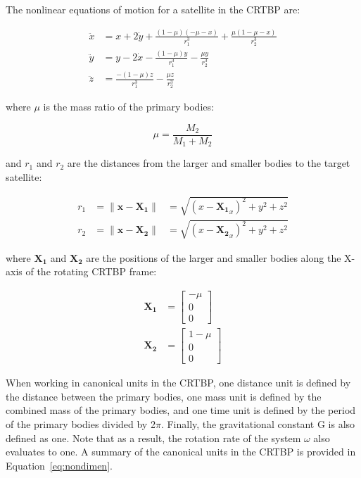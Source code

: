 \documentclass[letterpaper, preprint, paper,11pt]{AAS}	%
\begin{document}
The nonlinear equations of motion for a satellite in the CRTBP are:

\begin{equation} \label{eq:CRTBP}
	\begin{aligned}
		\ddot{x} &= x + 2\dot{y} + \frac{(1 - \mu)(-\mu - x)}{r_1^3} + \frac{\mu(1 - \mu - x)}{r_2^3} \\
		\ddot{y} &= y - 2\dot{x} - \frac{(1 - \mu)y}{r_1^3} - \frac{\mu y}{r_2^3} \\
		\ddot{z} &= \frac{-(1 - \mu)z}{r_1^3} - \frac{\mu z}{r_2^3}
	\end{aligned}
\end{equation}

where \(\mu\) is the mass ratio of the primary bodies:

\begin{equation}
	\mu = \frac{M_2}{M_1 + M_2}
\end{equation}

and \(r_1\) and \(r_2\) are the distances from the larger and smaller bodies to the target satellite:

\begin{equation}
	\begin{aligned}
		r_1 &= \| \mathbf{x} - \mathbf{X_1} \| &= \sqrt{(x-\mathbf{X_1}_x)^2 + y^2 + z^2} \\
		r_2 &= \| \mathbf{x} - \mathbf{X_2} \| &= \sqrt{(x-\mathbf{X_2}_x)^2 + y^2 + z^2}
	\end{aligned}
\end{equation}

where \(\mathbf{X_1}\) and \(\mathbf{X_2}\) are the positions of the larger and smaller bodies along the X-axis of the rotating CRTBP frame:

\begin{equation}
	\begin{aligned}
		\mathbf{X_1} &= \begin{bmatrix}
			-\mu \\ 0 \\ 0 
		\end{bmatrix} \\
		\mathbf{X_2} &= \begin{bmatrix}
			1 - \mu \\ 0 \\ 0
		\end{bmatrix}
	\end{aligned}
\end{equation}

When working in canonical units in the CRTBP, one distance unit is defined by the distance between the primary bodies, one mass unit is defined by the combined mass of the primary bodies, and one time unit is defined by the period of the primary bodies divided by 2\(\pi\).  Finally, the gravitational constant G is also defined as one. Note that as a result, the rotation rate of the system \(\omega\) also evaluates to one. A summary of the canonical units in the CRTBP is provided in Equation~\eqref{eq:nondimen}.
\end{document}
